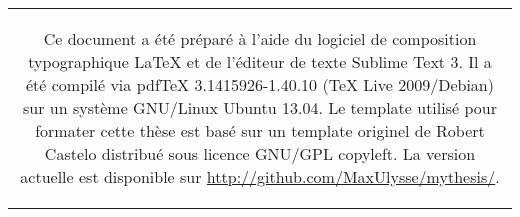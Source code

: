\singlespacing

	\begin{center}
		\begin{tabular}{c}
				\begin{minipage}[][4cm][c]{0.8\linewidth}
					\begin{tcolorbox}[colback=black!5!white,colframe=white!15!black]
						\sffamily
						Ce document a été préparé à l'aide du logiciel de composition typographique {\LaTeX} et de l'éditeur de texte Sublime Text 3. Il a été compilé via pdfTeX 3.1415926-1.40.10 (TeX Live 2009/Debian) sur un système GNU/Linux Ubuntu 13.04. Le template utilisé pour formater cette thèse est basé sur un template originel de Robert Castelo distribué sous licence GNU/GPL copyleft. La version actuelle est disponible sur \url{http://github.com/MaxUlysse/mythesis/}.
					\end{tcolorbox}
				\end{minipage}
		\end{tabular}
	\end{center}